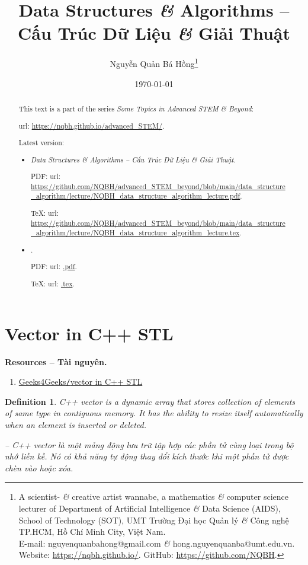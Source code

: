 \documentclass{article}
\title{Data Structures {\it\&} Algorithms -- Cấu Trúc Dữ Liệu {\it\&} Giải Thuật}
\author{Nguyễn Quản Bá Hồng\footnote{A scientist- {\it\&} creative artist wannabe, a mathematics {\it\&} computer science lecturer of Department of Artificial Intelligence {\it\&} Data Science (AIDS), School of Technology (SOT), UMT Trường Đại học Quản lý {\it\&} Công nghệ TP.HCM, Hồ Chí Minh City, Việt Nam.\\E-mail: {\sf nguyenquanbahong@gmail.com} {\it\&} {\sf hong.nguyenquanba@umt.edu.vn}. Website: \url{https://nqbh.github.io/}. GitHub: \url{https://github.com/NQBH}.}}
\date{\today}
\newtheorem{definition}{Definition}
\begin{document}
\maketitle
\begin{abstract}
	This text is a part of the series {\it Some Topics in Advanced STEM \& Beyond}:
	
	{\sc url}: \url{https://nqbh.github.io/advanced_STEM/}.
	
	Latest version:
	\begin{itemize}
		\item {\it Data Structures \& Algorithms -- Cấu Trúc Dữ Liệu \& Giải Thuật}.
		
		PDF: {\sc url}: \url{https://github.com/NQBH/advanced_STEM_beyond/blob/main/data_structure_algorithm/lecture/NQBH_data_structure_algorithm_lecture.pdf}.
		
		\TeX: {\sc url}: \url{https://github.com/NQBH/advanced_STEM_beyond/blob/main/data_structure_algorithm/lecture/NQBH_data_structure_algorithm_lecture.tex}.
		\item {\it }.
		
		PDF: {\sc url}: \url{.pdf}.
		
		\TeX: {\sc url}: \url{.tex}.
	\end{itemize}
\end{abstract}
\tableofcontents


\section{Vector in C++ STL}
\textbf{\textsf{Resources -- Tài nguyên.}}
\begin{enumerate}
	\item \href{https://www.geeksforgeeks.org/vector-in-cpp-stl/}{Geeks4Geeks{\tt/}vector in C++ STL}
\end{enumerate}

\begin{definition}
	{\rm C++ vector} is a dynamic array that stores collection of elements of same type in contiguous memory. It has the ability to resize itself automatically when an element is inserted or deleted.
	
	-- {\rm C++ vector} là một mảng động lưu trữ tập hợp các phần tử cùng loại trong bộ nhớ liền kề. Nó có khả năng tự động thay đổi kích thước khi một phần tử được chèn vào hoặc xóa.
\end{definition}
\end{document}
